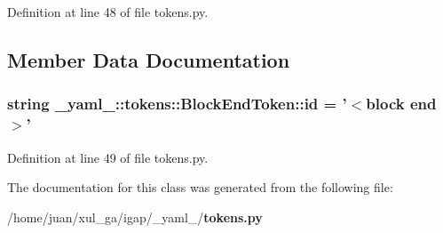 Definition at line 48 of file tokens.py.

\subsection{Member Data Documentation}
\subsubsection{\setlength{\rightskip}{0pt plus 5cm}string {\bf \_\-yaml\_\-::tokens::BlockEndToken::id} = '$<$block end$>$'\hspace{0.3cm}{\tt  [static]}}\label{class__yaml___1_1tokens_1_1BlockEndToken_e1e579e97bef402872461133518ad97c}




Definition at line 49 of file tokens.py.

The documentation for this class was generated from the following file:\begin{CompactItemize}
\item 
/home/juan/xul\_\-ga/igap/\_\-yaml\_\-/{\bf tokens.py}\end{CompactItemize}

